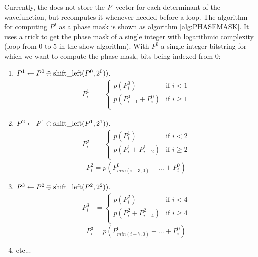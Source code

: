 \documentclass[./thesis.tex]{subfiles}
\begin{document}
Currently, the \QP does not store the ${{{P}}}$ vector for each determinant of the wavefunction, but recomputes it whenever needed before a loop.
The algorithm for computing $P^I$ as a phase mask is shown as algorithm \ref{alg:PHASEMASK}. It uses a trick to get the phase mask of a single integer with logarithmic complexity (loop from $0$ to $5$ in the show algorithm). With $P^0$ a single-integer bitstring for which we want to compute the phase mask, bits being indexed from $0$:

\begin{enumerate}
\item
$P^1 \gets P^0 \oplus \text{shift\_left}(P^0,2^0))$.\\
\begin{align}
P^1_i& =
  \begin{cases}
  	p(P^0_i)  & \text{if } i<1 \\
  	p(P_{i-1}^0 + P_{i}^0)   & \text{if } i \geq 1 \\
  \end{cases}
\end{align}

\item
$P^2 \gets P^1 \oplus \text{shift\_left}(P^1,2^1))$.\\
\begin{align}
P^2_i& =
  \begin{cases}
  	p(P^1_i)  & \text{if } i<2 \\
  	p(P_i^1 + P_{i-2}^1)    & \text{if } i \geq 2 \\
  \end{cases}
\end{align}
\begin{equation}
P^2_i = p(P_{min(i-3, 0)}^0 + \ldots + P_i^0)
\end{equation}
\item
$P^3 \gets P^2 \oplus \text{shift\_left}(P^2,2^2))$.\\
\begin{align}
P^3_i& =
  \begin{cases}
  	p(P^2_i)  & \text{if } i<4 \\
  	p(P_i^2 + P_{i-4}^2)    & \text{if } i \geq 4 \\
  \end{cases}
\end{align}
\begin{equation}
P^3_i = p(P_{min(i-7, 0)}^0 + \ldots + P_i^0)
\end{equation}
\item
etc...
\end{enumerate}
\end{document}
